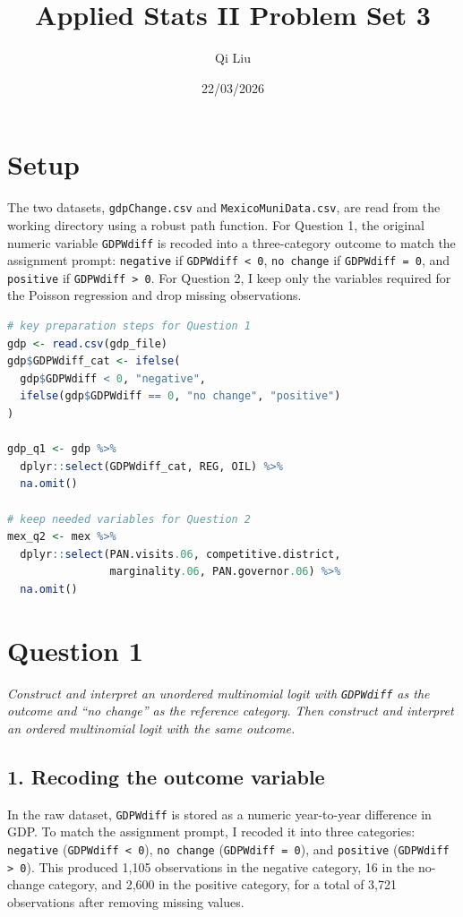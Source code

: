 \documentclass[12pt,letterpaper]{article}
\title{Applied Stats II Problem Set 3}
\date{22/03/2026}
\author{Qi Liu}
\begin{document}
\maketitle

\section*{Setup }
The two datasets, \texttt{gdpChange.csv} and \texttt{MexicoMuniData.csv}, are read from the working directory using a robust path function. For Question 1, the original numeric variable \texttt{GDPWdiff} is recoded into a three-category outcome to match the assignment prompt: \texttt{negative} if \texttt{GDPWdiff < 0}, \texttt{no change} if \texttt{GDPWdiff = 0}, and \texttt{positive} if \texttt{GDPWdiff > 0}. For Question 2, I keep only the variables required for the Poisson regression and drop missing observations. 

\begin{lstlisting}[language=R]
# key preparation steps for Question 1
gdp <- read.csv(gdp_file)
gdp$GDPWdiff_cat <- ifelse(
  gdp$GDPWdiff < 0, "negative",
  ifelse(gdp$GDPWdiff == 0, "no change", "positive")
)

gdp_q1 <- gdp %>%
  dplyr::select(GDPWdiff_cat, REG, OIL) %>%
  na.omit()

# keep needed variables for Question 2
mex_q2 <- mex %>%
  dplyr::select(PAN.visits.06, competitive.district,
                marginality.06, PAN.governor.06) %>%
  na.omit()
\end{lstlisting}

\section*{Question 1}
\noindent\emph{Construct and interpret an unordered multinomial logit with \texttt{GDPWdiff} as the outcome and ``no change'' as the reference category. Then construct and interpret an ordered multinomial logit with the same outcome.}

\subsection*{1. Recoding the outcome variable}
In the raw dataset, \texttt{GDPWdiff} is stored as a numeric year-to-year difference in GDP. To match the assignment prompt, I recoded it into three categories: \texttt{negative} (\texttt{GDPWdiff < 0}), \texttt{no change} (\texttt{GDPWdiff = 0}), and \texttt{positive} (\texttt{GDPWdiff > 0}). This produced 1,105 observations in the negative category, 16 in the no-change category, and 2,600 in the positive category, for a total of 3,721 observations after removing missing values.
\end{document}
